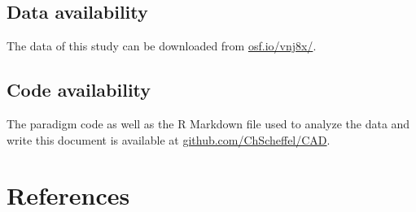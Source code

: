 \documentclass[
  man,floatsintext]{apa6}
\begin{document}
\hypertarget{data-availability}{%
\subsection{Data availability}\label{data-availability}}

The data of this study can be downloaded from \href{https://osf.io/vnj8x/}{osf.io/vnj8x/}.

\hypertarget{code-availability}{%
\subsection{Code availability}\label{code-availability}}

The paradigm code as well as the R Markdown file used to analyze the data and write this document is available at \href{https://github.com/ChScheffel/CAD}{github.com/ChScheffel/CAD}.

\newpage

\hypertarget{references}{%
\section{References}\label{references}}

\begingroup
\setlength{\parindent}{-0.5in}
\setlength{\leftskip}{0.5in}
\end{document}
